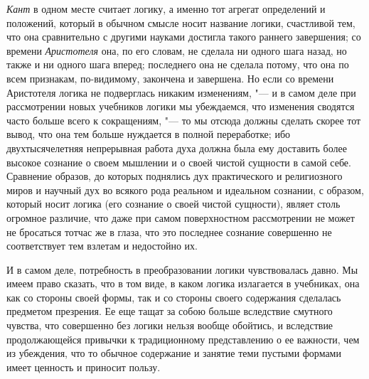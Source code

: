 {\em Кант} в одном месте
считает логику, а именно тот агрегат определений и положений, который в
обычном смысле носит название логики, счастливой тем, что она сравнительно
с другими науками достигла такого раннего завершения; со времени
{\em Аристотеля} она, по его словам, не сделала ни
одного шага назад, но также и ни одного шага вперед; последнего она не
сделала потому, что она по всем признакам, по-видимому, закончена и
завершена. Но если со времени Аристотеля логика не подверглась никаким
изменениям, "--- и в самом деле при рассмотрении новых учебников логики мы
убеждаемся, что изменения сводятся часто больше всего к сокращениям, "--- то
мы отсюда должны сделать скорее тот вывод, что она тем больше нуждается в
полной переработке; ибо двухтысячелетняя непрерывная работа духа должна
была ему доставить более высокое сознание о своем мышлении и о своей чистой
сущности в самой себе. Сравнение образов, до которых поднялись дух
практического и религиозного миров и научный дух во всякого рода реальном и
идеальном сознании, с образом, который носит логика (его сознание о своей
чистой сущности), являет столь огромное различие, что даже при самом
поверхностном рассмотрении не может не бросаться тотчас же в глаза, что это
последнее сознание совершенно не соответствует тем взлетам и недостойно их.

И в самом деле, потребность в преобразовании логики чувствовалась давно. Мы
имеем право сказать, что в том виде, в каком логика излагается в учебниках,
она как со стороны своей формы, так и со стороны своего содержания
сделалась предметом презрения. Ее еще тащат за собою больше вследствие
смутного чувства, что совершенно без логики нельзя вообще обойтись, и
вследствие продолжающейся привычки к традиционному представлению о ее
важности, чем из убеждения, что то обычное содержание и занятие теми
пустыми формами имеет ценность и приносит пользу.

